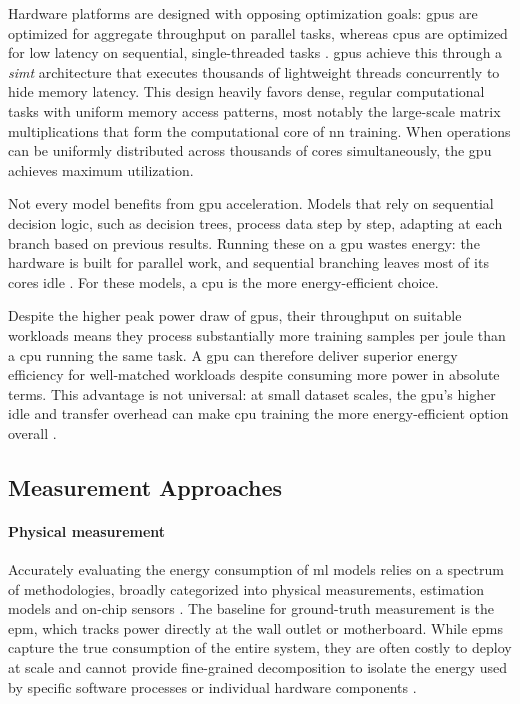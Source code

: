 Hardware platforms are designed with opposing optimization goals: \glspl{gpu} are optimized for aggregate throughput on parallel tasks, whereas \glspl{cpu} are optimized for low latency on sequential, single-threaded tasks \parencite{nickollsGPUComputingEra2010}. \glspl{gpu} achieve this through a \textit{\gls{simt}} architecture that executes thousands of lightweight threads concurrently to hide memory latency. This design heavily favors dense, regular computational tasks with uniform memory access patterns, most notably the large-scale matrix multiplications that form the computational core of \gls{nn} training. When operations can be uniformly distributed across thousands of cores simultaneously, the \gls{gpu} achieves maximum utilization.

Not every model benefits from \gls{gpu} acceleration. Models that rely on sequential decision logic, such as decision trees, process data step by step, adapting at each branch based on previous results. Running these on a \gls{gpu} wastes energy: the hardware is built for parallel work, and sequential branching leaves most of its cores idle \parencite{mitchellAcceleratingXGBoostAlgorithm2017,nickollsGPUComputingEra2010}. For these models, a \gls{cpu} is the more energy-efficient choice.

Despite the higher peak power draw of \glspl{gpu}, their throughput on suitable workloads means they process substantially more training samples per joule than a \gls{cpu} running the same task. A \gls{gpu} can therefore deliver superior energy efficiency for well-matched workloads despite consuming more power in absolute terms. This advantage is not universal: at small dataset scales, the \gls{gpu}'s higher idle and transfer overhead can make \gls{cpu} training the more energy-efficient option overall \parencite{wuSustainableAIEnvironmental2022, rodriguezEvaluatingEnergyConsumption2024}.

\subsection{Measurement Approaches}
\label{sec:theoretical_measurement}

\paragraph{Physical measurement} Accurately evaluating the energy consumption of \gls{ml} models relies on a spectrum of methodologies, broadly categorized into physical measurements, estimation models and on-chip sensors \parencite{rodriguezEvaluatingEnergyConsumption2024}. The baseline for ground-truth measurement is the \gls{epm}, which tracks power directly at the wall outlet or motherboard. While \glspl{epm} capture the true consumption of the entire system, they are often costly to deploy at scale and cannot provide fine-grained decomposition to isolate the energy used by specific software processes or individual hardware components \parencite{rodriguezEvaluatingEnergyConsumption2024}.

